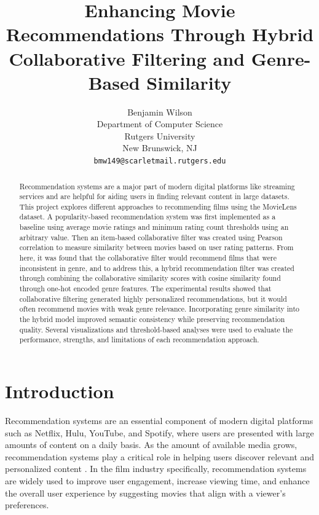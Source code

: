 \documentclass{article}
\title{Enhancing Movie Recommendations Through Hybrid Collaborative Filtering and Genre-Based Similarity}
\author{
Benjamin Wilson \\
Department of Computer Science \\
Rutgers University \\
New Brunswick, NJ \\
\texttt{bmw149@scarletmail.rutgers.edu}
}
\begin{document}
\maketitle

\begin{abstract}
Recommendation systems are a major part of modern digital platforms like streaming services and are helpful for aiding users in finding relevant content in large datasets. This project explores different approaches to recommending films using the MovieLens dataset. A popularity-based recommendation system was first implemented as a baseline using average movie ratings and minimum rating count thresholds using an arbitrary value. Then an item-based collaborative filter was created using Pearson correlation to measure similarity between movies based on user rating patterns. From here, it was found that the collaborative filter would recommend films that were inconsistent in genre, and to address this, a hybrid recommendation filter was created through combining the collaborative similarity scores with cosine similarity found through one-hot encoded genre features. The experimental results showed that collaborative filtering generated highly personalized recommendations, but it would often recommend movies with weak genre relevance. Incorporating genre similarity into the hybrid model improved semantic consistency while preserving recommendation quality. Several visualizations and threshold-based analyses were used to evaluate the performance, strengths, and limitations of each recommendation approach.

\end{abstract}



\section{Introduction}
Recommendation systems are an essential component of modern digital platforms such as Netflix, Hulu, YouTube, and Spotify, where users are presented with large amounts of content on a daily basis. As the amount of available media grows, recommendation systems play a critical role in helping users discover relevant and personalized content \cite{ricci2011recommender}. In the film industry specifically, recommendation systems are widely used to improve user engagement, increase viewing time, and enhance the overall user experience by suggesting movies that align with a viewer's preferences.
\end{document}
